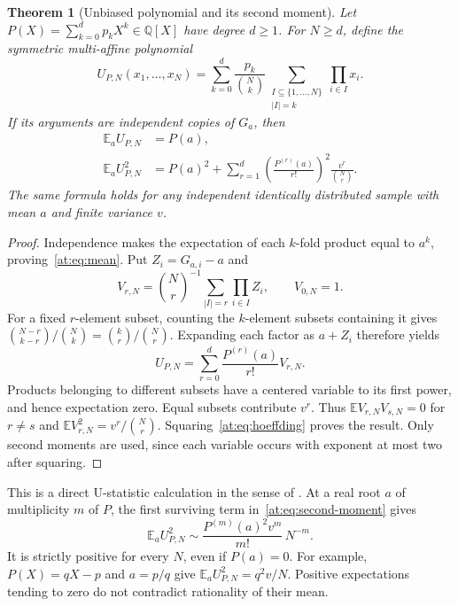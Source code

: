 \documentclass[11pt,a4paper]{article}
\newcommand{\Q}{\mathbb Q}
\newcommand{\E}{\mathbb E}
\newtheorem{theorem}{Theorem}[section]
\theoremstyle{definition}
\theoremstyle{remark}
\numberwithin{equation}{section}
\begin{document}
\begin{theorem}[Unbiased polynomial and its second moment]
\label{at:sta:moments}
Let $P(X)=\sum_{k=0}^d p_kX^k\in\Q[X]$ have degree $d\ge1$. For $N\ge d$,
define the symmetric multi-affine polynomial
\begin{equation}
 U_{P,N}(x_1,\ldots,x_N)=
 \sum_{k=0}^d\frac{p_k}{\binom Nk}
 \sum_{\substack{I\subseteq\{1,\ldots,N\}\\ |I|=k}}\prod_{i\in I}x_i.
 \label{at:eq:unbiased}
\end{equation}
If its arguments are independent copies of $G_a$, then
\begin{align}
 \E_a U_{P,N}&=P(a),\label{at:eq:mean}\\
 \E_a U_{P,N}^2&=P(a)^2+
 \sum_{r=1}^d\left(\frac{P^{(r)}(a)}{r!}\right)^2
 \frac{v^r}{\binom Nr}.
 \label{at:eq:second-moment}
\end{align}
The same formula holds for any independent identically distributed
sample with mean $a$ and finite variance $v$.
\end{theorem}
\begin{proof}
Independence makes the expectation of each $k$-fold product equal to
$a^k$, proving~\eqref{at:eq:mean}. Put $Z_i=G_{a,i}-a$ and
\[
 V_{r,N}=\binom Nr^{-1}\sum_{|I|=r}\prod_{i\in I}Z_i,
 \qquad V_{0,N}=1.
\]
For a fixed $r$-element subset, counting the $k$-element subsets
containing it gives
$\binom{N-r}{k-r}/\binom Nk=\binom kr/\binom Nr$. Expanding each
factor as $a+Z_i$ therefore yields
\begin{equation}
 U_{P,N}=\sum_{r=0}^d\frac{P^{(r)}(a)}{r!}V_{r,N}.
 \label{at:eq:hoeffding}
\end{equation}
Products belonging to different subsets have a centered variable to
its first power, and hence expectation zero. Equal subsets contribute
$v^r$. Thus $\E V_{r,N}V_{s,N}=0$ for $r\ne s$ and
$\E V_{r,N}^2=v^r/\binom Nr$. Squaring~\eqref{at:eq:hoeffding} proves
the result. Only second moments are used, since each variable occurs
with exponent at most two after squaring.
\end{proof}

This is a direct U-statistic calculation in the sense of
\cite{at:Hoeffding1948}. At a real root $a$ of multiplicity $m$ of $P$,
the first surviving term in~\eqref{at:eq:second-moment} gives
\begin{equation}
 \E_a U_{P,N}^2\sim
 \frac{P^{(m)}(a)^2v^m}{m!}\,N^{-m}.
 \label{at:eq:root-asymptotic}
\end{equation}
It is strictly positive for every $N$, even if $P(a)=0$. For example,
$P(X)=qX-p$ and $a=p/q$ give $\E_a U_{P,N}^2=q^2v/N$.
Positive expectations tending to zero do not contradict rationality
of their mean.
\end{document}
